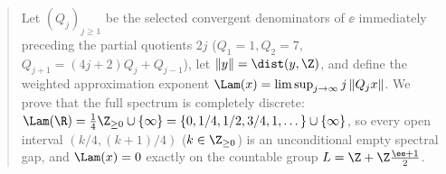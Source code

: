 
\maketitle

\begin{abstract}
Let $(Q_j)_{j\ge1}$ be the selected convergent denominators of $\ee$
immediately preceding the partial quotients $2j$
($Q_1=1,Q_2=7$, $Q_{j+1}=(4j+2)Q_j+Q_{j-1}$), let $\|y\|=\dist(y,\Z)$, and
define the weighted approximation exponent
$\Lam(x)=\limsup_{j\to\infty} j\,\|Q_j x\|$. We prove that the full spectrum is
completely discrete:
$\Lam(\R)=\frac14\Z_{\ge0}\cup\{\infty\}=\{0,1/4,1/2,3/4,1,\dots\}\cup\{\infty\}$,
so every open interval $(k/4,(k+1)/4)$ ($k\in\Z_{\ge0}$) is an unconditional
empty spectral gap, and $\Lam(x)=0$ exactly on the countable group
$L=\Z+\Z\frac{\ee+1}{2}$.


\end{abstract}
